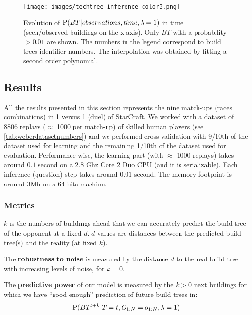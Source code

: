 \begin{figure}
\centerline{\texttt{[image: images/techtree\_inference\_color3.png]}}
\caption{Evolution of $\mathrm{P}(BT|observations,time,\lambda=1)$ in time (seen/observed buildings on the x-axis). Only $BT$ with a probability $> 0.01$ are shown. The numbers in the legend correspond to build trees identifier numbers. The interpolation was obtained by fitting a second order polynomial.}
\label{fig:ttinf}
\end{figure}


\subsection{Results}
All the results presented in this section represents the nine match-ups (races combinations) in 1 versus 1 (duel) of StarCraft. We worked with a dataset of 8806 replays ($\approx$ 1000 per match-up) of skilled human players (see \ref{tab:weberdatasetnumbers}) and we performed cross-validation with 9/10th of the dataset used for learning and the remaining 1/10th of the dataset used for evaluation. Performance wise, the learning part (with $\approx$ 1000 replays) takes around $0.1$ second on a 2.8 Ghz Core 2 Duo CPU (and it is serializable). Each inference (question) step takes around $0.01$ second. The memory footprint is around 3Mb on a 64 bits machine.

\subsubsection{Metrics}
\label{sec:buildtreemetrics}
$k$ is the numbers of buildings ahead that we can accurately predict the build tree of the opponent at a fixed $d$. $d$ values are distances between the predicted build tree(s) and the reality (at fixed $k$).

The \textbf{robustness to noise} is measured by the distance $d$ to the real build tree with increasing levels of noise, for $k=0$.

The \textbf{predictive power} of our model is measured by the $k>0$ next buildings for which we have ``good enough'' prediction of future build trees in:
$$\mathrm{P}(BT^{t+k} | T=t, O_{1:N}=o_{1:N}, \lambda = 1)$$

